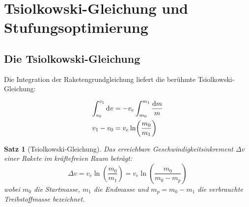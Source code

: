 ﻿\documentclass[12pt,a4paper]{article}
\newtheorem{satz}{Satz}[section]
\newcommand{\ve}{v_e}
\newcommand{\Dv}{\Delta v}
\begin{document}
\section{Tsiolkowski-Gleichung und Stufungsoptimierung}

\subsection{Die Tsiolkowski-Gleichung}

Die Integration der Raketengrundgleichung liefert die berühmte
Tsiolkowski-Gleichung:

\begin{align}
  \int_{v_0}^{v_1} \dd v &= -\ve \int_{m_0}^{m_1} \frac{\dd m}{m} \notag\\
  v_1 - v_0 &= \ve \ln\!\left(\frac{m_0}{m_1}\right)
\end{align}

\begin{satz}[Tsiolkowski-Gleichung]
Das erreichbare Geschwindigkeitsinkrement $\Dv$ einer Rakete im kräftefreien Raum
beträgt:
\[
  \boxed{\Dv = \ve \ln\!\left(\frac{m_0}{m_1}\right) = \ve \ln\!\left(\frac{m_0}{m_0 - m_p}\right)}
\]
wobei $m_0$ die Startmasse, $m_1$ die Endmasse und $m_p = m_0 - m_1$ die
verbrauchte Treibstoffmasse bezeichnet.
\end{satz}
\end{document}
